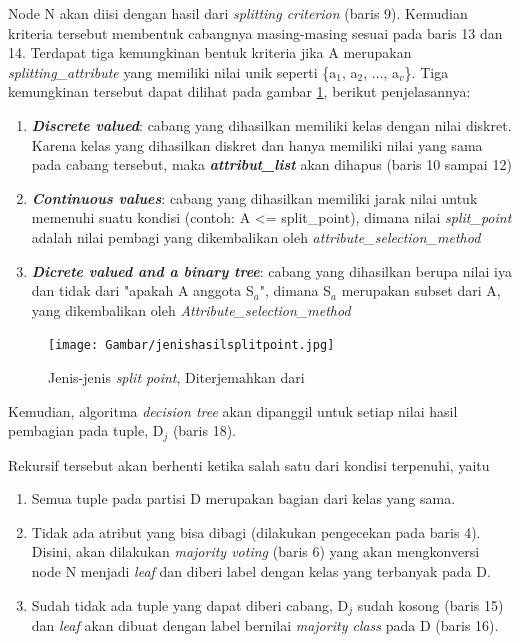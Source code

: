 Node N akan diisi dengan hasil dari \textsl{splitting criterion} (baris 9). Kemudian kriteria tersebut membentuk cabangnya masing-masing sesuai pada baris 13 dan 14. Terdapat tiga kemungkinan bentuk kriteria jika A merupakan \textsl{splitting\_attribute} yang memiliki nilai unik seperti \{a$_{1}$, a$_{2}$, ..., a$_{v}$\}. Tiga kemungkinan tersebut dapat dilihat pada gambar \ref{fig:splitPoint}, berikut penjelasannya:

\begin{enumerate}
	\item \textbf{\textsl{Discrete valued}}: cabang yang dihasilkan memiliki kelas dengan nilai diskret. Karena kelas yang dihasilkan diskret dan hanya memiliki nilai yang sama pada cabang tersebut, maka \textbf{\textsl{attribut\_list}} akan dihapus (baris 10 sampai 12)
	\item \textbf{\textsl{Continuous values}}: cabang yang dihasilkan memiliki jarak nilai untuk memenuhi suatu kondisi (contoh: A <= split\_point), dimana nilai \textsl{split\_point} adalah nilai pembagi yang dikembalikan oleh \textsl{attribute\_selection\_method}
	\item \textbf{\textsl{Dicrete valued and a binary tree}}: cabang yang dihasilkan berupa nilai iya dan tidak dari "apakah A anggota S$_{a}$", dimana S$_{a}$ merupakan subset dari A, yang dikembalikan oleh \textsl{Attribute\_selection\_method}
\end{enumerate}


\begin{figure}
\centering
\texttt{[image: Gambar/jenishasilsplitpoint.jpg]}
\caption[Jenis-jenis \textsl{split point}]{Jenis-jenis \textsl{split point}, Diterjemahkan dari \cite{DM}} 
\label{fig:splitPoint}
\end{figure}

Kemudian, algoritma \textsl{decision tree} akan dipanggil untuk setiap nilai hasil pembagian pada tuple, D$_{j}$  (baris 18).

Rekursif tersebut akan berhenti ketika salah satu dari kondisi terpenuhi, yaitu

\begin{enumerate}
	\item Semua tuple pada partisi D merupakan bagian dari kelas yang sama.
	\item Tidak ada atribut yang bisa dibagi (dilakukan pengecekan pada baris 4). Disini, akan dilakukan \textsl{majority voting} (baris 6) yang akan mengkonversi node N menjadi \textsl{leaf} dan diberi label dengan kelas yang terbanyak pada D.
	\item Sudah tidak ada tuple yang dapat diberi cabang, D$_{j}$ sudah kosong (baris 15) dan \textsl{leaf} akan dibuat dengan label bernilai \textsl{majority class} pada D (baris 16).
\end{enumerate}

